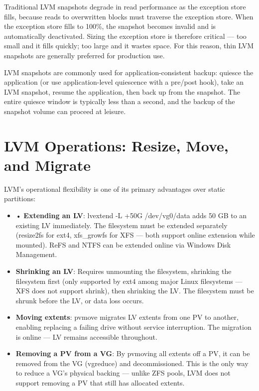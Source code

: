 Traditional LVM snapshots degrade in read performance as the exception store fills, because reads to overwritten blocks must traverse the exception store. When the exception store fills to 100\%, the snapshot becomes invalid and is automatically deactivated. Sizing the exception store is therefore critical --- too small and it fills quickly; too large and it wastes space. For this reason, thin LVM snapshots are generally preferred for production use.

LVM snapshots are commonly used for application-consistent backup: quiesce the application (or use application-level quiescence with a pre/post hook), take an LVM snapshot, resume the application, then back up from the snapshot. The entire quiesce window is typically less than a second, and the backup of the snapshot volume can proceed at leisure.

\section{LVM Operations: Resize, Move, and Migrate}
LVM's operational flexibility is one of its primary advantages over static partitions:

\begin{itemize}
  \item • \textbf{Extending an LV}: lvextend -L +50G /dev/vg0/data adds 50 GB to an existing LV immediately. The filesystem must be extended separately (resize2fs for ext4, xfs\_growfs for XFS --- both support online extension while mounted). ReFS and NTFS can be extended online via Windows Disk Management.
  \item \textbf{Shrinking an LV}: Requires unmounting the filesystem, shrinking the filesystem first (only supported by ext4 among major Linux filesystems --- XFS does not support shrink), then shrinking the LV. The filesystem must be shrunk before the LV, or data loss occurs.
  \item \textbf{Moving extents}: pvmove migrates LV extents from one PV to another, enabling replacing a failing drive without service interruption. The migration is online --- LV remains accessible throughout.
  \item \textbf{Removing a PV from a VG}: By pvmoving all extents off a PV, it can be removed from the VG (vgreduce) and decommissioned. This is the only way to reduce a VG's physical backing --- unlike ZFS pools, LVM does not support removing a PV that still has allocated extents.
\end{itemize}

